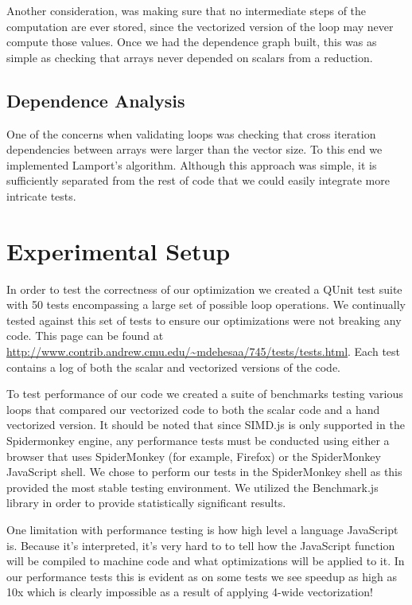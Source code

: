 \documentclass[conference]{IEEEtran}
\begin{document}
Another consideration, was making sure that no intermediate steps of the
computation are ever stored, since the vectorized version of the loop may never
compute those values. Once we had the dependence graph built, this was as
simple as checking that arrays never depended on scalars from a reduction.

\subsection{Dependence Analysis}

One of the concerns when validating loops was checking that cross iteration
dependencies between arrays were larger than the vector size. To this end we
implemented Lamport's algorithm. Although this approach was simple, it is
sufficiently separated from the rest of code that we could easily integrate more
intricate tests.

\section{Experimental Setup}

In order to test the correctness of our optimization we created a
QUnit\cite{qunit} test suite with 50 tests encompassing a large set of possible
loop operations. We continually tested against this set of tests to ensure our
optimizations were not breaking any code. This page can be found at
\url{http://www.contrib.andrew.cmu.edu/~mdehesaa/745/tests/tests.html}. Each
test contains a log of both the scalar and vectorized versions of the code.

To test performance of our code we created a suite of benchmarks testing
various loops that compared our vectorized code to both the scalar code and a
hand vectorized version. It should be noted that since SIMD.js is only
supported in the Spidermonkey\cite{spidermonkey} engine, any performance tests must be conducted
using either a browser that uses SpiderMonkey (for example, Firefox) or the
SpiderMonkey JavaScript shell.  We chose to perform our tests in the
SpiderMonkey shell as this provided the most stable testing environment. We
utilized the Benchmark.js library in order to provide statistically significant
results.

One limitation with performance testing is how high level a language JavaScript
is. Because it's interpreted, it's very hard to to tell how the JavaScript function will be
compiled to machine code and what optimizations will be applied to it. In our
performance tests this is evident as on some tests we see speedup as high as 10x
which is clearly impossible as a result of applying 4-wide vectorization!
\end{document}
